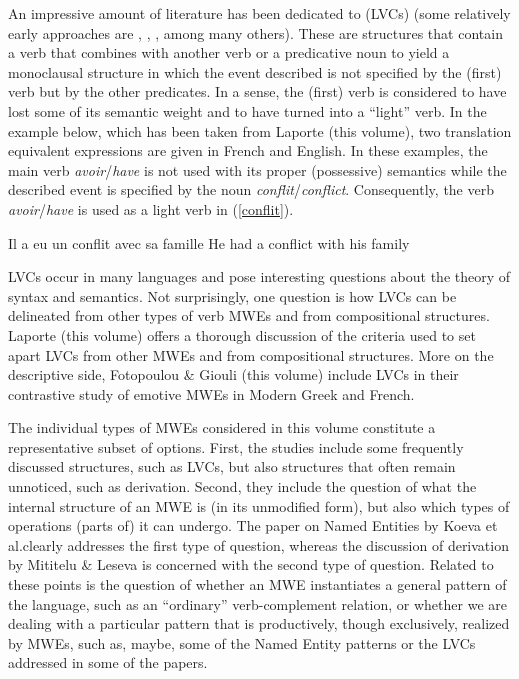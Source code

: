 \documentclass[output=paper]{langsci/langscibook}
\begin{document}
An impressive amount of literature has been dedicated to  (LVCs) (some relatively early approaches are \citet{Jespersen:65},  \citet{Gross1988a}, \citet{Butt:95}, \citet{Melchuk:98} among many others). These are structures that contain a verb that combines with another verb or a predicative noun to yield a monoclausal structure in which the event described is not specified by the (first) verb but by the other predicates. In a sense, the (first) verb is considered to have lost some of its semantic weight and to have turned into a ``light'' verb. In the example below, which has been taken from Laporte (this volume), two translation equivalent expressions are given in French and English. In these examples, the main verb \textit{avoir}/\textit{have} is not used with its proper (possessive) semantics while the described event is specified by the noun \textit{conflit}/\textit{conflict}. Consequently, the verb \textit{avoir}/\textit{have} is used as a light verb in (\ref{conflit}). 

\begin{exe}
\ex \label{conflit} 
\settowidth {}
\begin{xlist}
\ex Il a eu un conflit avec sa famille 
\ex  He had a conflict with his family 
\end{xlist}
\end{exe}

LVCs occur in many languages and pose interesting questions about the theory of syntax and semantics.  Not surprisingly, one question is how LVCs can be delineated from other types of verb MWEs and from compositional structures.  Laporte (this volume) offers a thorough discussion of the criteria used to set apart LVCs from other MWEs and from compositional structures.  More on the descriptive side,  Fotopoulou \&  Giouli (this volume) include LVCs in their contrastive study of emotive MWEs in Modern Greek and French.


The individual types of MWEs considered in this volume constitute a representative subset of options. First, the studies include some frequently  discussed structures, such as LVCs, but also structures that often remain unnoticed, such as derivation. Second, they include the question of what the internal structure of an MWE is (in its unmodified form), but also which types of operations (parts of) it can undergo. The paper on Named Entities by Koeva et al.\@ clearly addresses the first type of question, whereas the discussion of derivation by Mititelu \& Leseva is concerned with the second type of question. Related to these points is the question of whether an MWE instantiates a general pattern of the language, such as an “ordinary” verb-complement relation, or whether we are dealing with a particular pattern that is productively, though exclusively, realized by MWEs, such as, maybe, some of the Named Entity patterns or the LVCs addressed in some of the papers.
\end{document}
